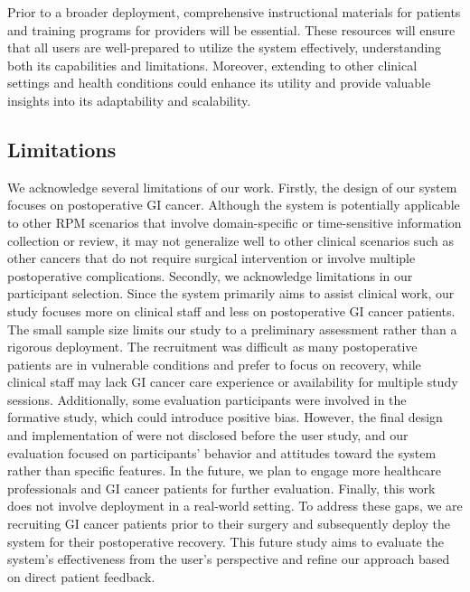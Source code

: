 Prior to a broader deployment, comprehensive instructional materials for patients and training programs for providers will be essential. These resources will ensure that all users are well-prepared to utilize the system effectively, understanding both its capabilities and limitations. Moreover, extending \projectname{} to other clinical settings and health conditions could enhance its utility and provide valuable insights into its adaptability and scalability.


\subsection{Limitations}
We acknowledge several limitations of our work. Firstly, the design of our system \projectname{} focuses on postoperative GI cancer. Although the system is potentially applicable to other RPM scenarios that involve domain-specific or time-sensitive information collection or review, it may not generalize well to other clinical scenarios such as other cancers that do not require surgical intervention or involve multiple postoperative complications.
Secondly, we acknowledge limitations in our participant selection. Since the system primarily aims to assist clinical work, our study focuses more on clinical staff and less on postoperative GI cancer patients. The small sample size limits our study to a preliminary assessment rather than a rigorous deployment. The recruitment was difficult as many postoperative patients are in vulnerable conditions and prefer to focus on recovery, while clinical staff may lack GI cancer care experience or availability for multiple study sessions. Additionally, some evaluation participants were involved in the formative study, which could introduce positive bias. However, the final design and implementation of \projectname{} were not disclosed before the user study, and our evaluation focused on participants' behavior and attitudes toward the system rather than specific features. In the future, we plan to engage more healthcare professionals and GI cancer patients for further evaluation.
Finally, this work does not involve deployment in a real-world setting. To address these gaps, we are recruiting GI cancer patients prior to their surgery and subsequently deploy the system for their postoperative recovery. This future study aims to evaluate the system's effectiveness from the user's perspective and refine our approach based on direct patient feedback.
